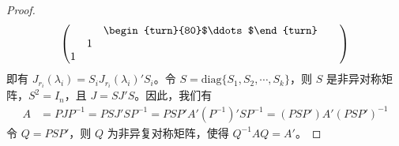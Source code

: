 \documentclass[../../main.tex]{subfiles}
\begin{document}
\begin{proof}
\begin{align*}
\begin{pmatrix}
& & \begin{turn}{80}$\ddots$\end{turn} & & \\
& 1 & & & \\
1 & & & &
\end{pmatrix}
\end{align*}
即有 $J_{r_i}(\lambda_i) = S_iJ_{r_i}(\lambda_i)'S_i$。令 $S = \mathrm{diag}\{S_1,S_2,\cdots,S_k\}$，则 $S$ 是非异对称矩阵，$S^2 = I_n$，且 $J = SJ'S$。因此，我们有
\begin{align*}
A &= PJP^{-1} = PSJ'SP^{-1} = PSP'A'(P^{-1})'SP^{-1} = (PSP')A'(PSP')^{-1}
\end{align*}
令 $Q = PSP'$，则 $Q$ 为非异复对称矩阵，使得 $Q^{-1}AQ = A'$。

\end{proof}
\end{document}
